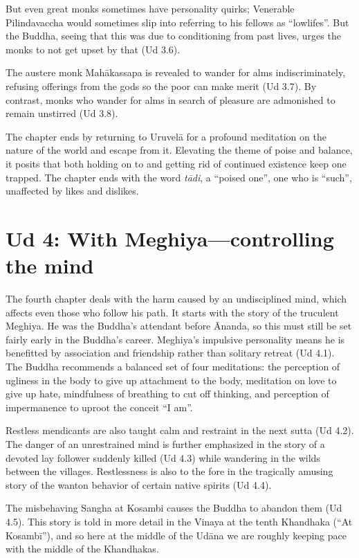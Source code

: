 \documentclass[12pt,openany]{book}%
\begin{document}
But even great monks sometimes have personality quirks; Venerable Pilindavaccha would sometimes slip into referring to his fellows as “lowlifes”. But the Buddha, seeing that this was due to conditioning from past lives,  urges the monks to not get upset by that (Ud 3.6). 

The austere monk \textsanskrit{Mahākassapa} is revealed to wander for alms indiscriminately, refusing offerings from the gods so the poor can make merit (Ud 3.7). By contrast, monks who wander for alms in search of pleasure are admonished to remain unstirred (Ud 3.8). 

The chapter ends by returning to \textsanskrit{Uruvelā} for a profound meditation on the nature of the world and escape from it. Elevating the theme of poise and balance, it posits that both holding on to and getting rid of continued existence keep one trapped. The chapter ends with the word \textit{\textsanskrit{tādi}}, a “poised one”, one who is “such”, unaffected by likes and dislikes. 

\section*{Ud 4: With Meghiya—controlling the mind}

The fourth chapter deals with the harm caused by an undisciplined mind, which affects even those who follow his path. It starts with the story of the truculent Meghiya. He was the Buddha’s attendant before Ānanda, so this must still be set fairly early in the Buddha’s career. Meghiya’s impulsive personality means he is benefitted by association and friendship rather than solitary retreat (Ud 4.1). The Buddha recommends a balanced set of four meditations: the perception of ugliness in the body to give up attachment to the body, meditation on love to give up hate, mindfulness of breathing to cut off thinking, and perception of impermanence to uproot the conceit “I am”.

Restless mendicants are also taught calm and restraint in the next sutta (Ud 4.2). The danger of an unrestrained mind is further emphasized in the story of a devoted lay follower suddenly killed (Ud 4.3) while wandering in the wilds between the villages. Restlessness is also to the fore in the tragically amusing story of the wanton behavior of certain native spirits (Ud 4.4). 

The misbehaving Sangha at Kosambi causes the Buddha to abandon them (Ud 4.5). This story is told in more detail in the Vinaya at the tenth Khandhaka (“At \textsanskrit{Kosambī}”), and so here at the middle of the \textsanskrit{Udāna} we are roughly keeping pace with the middle of the Khandhakas. 
\end{document}
